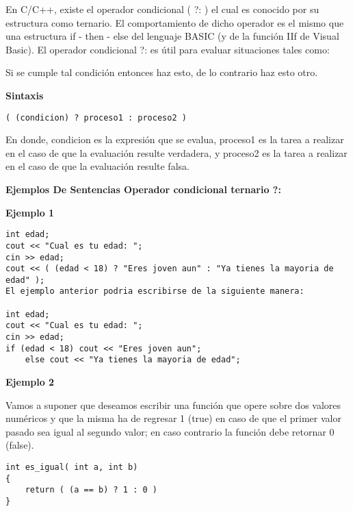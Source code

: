 En C/C++, existe el operador condicional ( ?: ) el cual es conocido por su estructura como ternario. El comportamiento de dicho operador es el mismo que una estructura if - then - else del lenguaje BASIC (y de la función IIf de Visual Basic). El operador condicional ?: es útil para evaluar situaciones tales como:

Si se cumple tal condición entonces haz esto, de lo contrario haz esto otro.

\begin{center}
	\textbf{Sintaxis}
\end{center}

\begin{lstlisting}[style=Cpp, label=sintaxis-switch, caption=Sintaxis Switch]
( (condicion) ? proceso1 : proceso2 )
\end{lstlisting}

En donde, condicion es la expresión que se evalua, proceso1 es la tarea a realizar en el caso de que la evaluación resulte verdadera, y proceso2 es la tarea a realizar en el caso de que la evaluación resulte falsa.

\begin{center}
	\textbf{Ejemplos De Sentencias Operador condicional ternario ?:}
\end{center}

\textbf{Ejemplo 1}

\begin{lstlisting}[style=Cpp, label=condicional-ejemplo-1, caption=Condicional Ejemplo 1]
int edad;
cout << "Cual es tu edad: ";
cin >> edad;
cout << ( (edad < 18) ? "Eres joven aun" : "Ya tienes la mayoria de edad" );
El ejemplo anterior podria escribirse de la siguiente manera:

int edad;
cout << "Cual es tu edad: ";
cin >> edad;
if (edad < 18) cout << "Eres joven aun";
    else cout << "Ya tienes la mayoria de edad";
\end{lstlisting}

\textbf{Ejemplo 2}

Vamos a suponer que deseamos escribir una función que opere sobre dos valores numéricos y que la misma ha de regresar 1 (true) en caso de que el primer valor pasado sea igual al segundo valor; en caso contrario la función debe retornar 0 (false).

\begin{lstlisting}[style=Cpp, label=condicional-ejemplo-2, caption=Condicional Ejemplo 2]
int es_igual( int a, int b)
{
    return ( (a == b) ? 1 : 0 )
}
\end{lstlisting}


